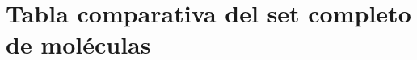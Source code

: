 \chapter{Tabla comparativa del set completo de moléculas}

\label{apend:tabla_intro_grande}


\begin{landscape}



\end{landscape}
